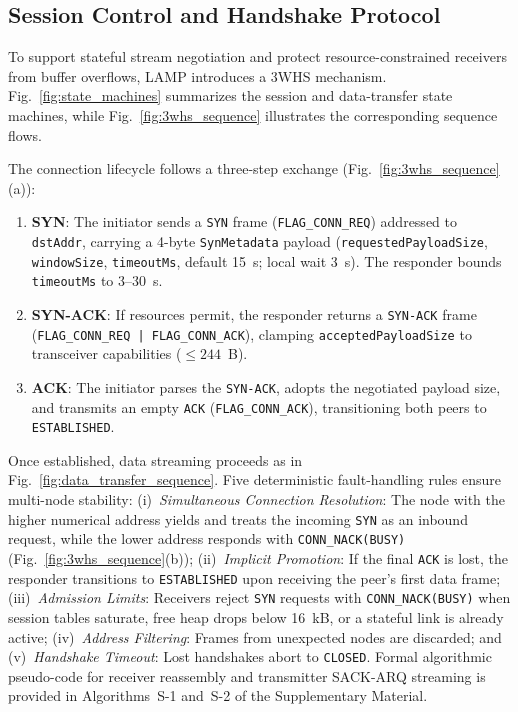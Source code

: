 \documentclass[journal]{IEEEtran}
\begin{document}
\subsection{Session Control and Handshake Protocol}
To support stateful stream negotiation and protect resource-constrained receivers from buffer overflows, \ac{LAMP} introduces a \ac{3WHS} mechanism. Fig.~\ref{fig:state_machines} summarizes the session and data-transfer state machines, while Fig.~\ref{fig:3whs_sequence} illustrates the corresponding sequence flows.

The connection lifecycle follows a three-step exchange (Fig.~\ref{fig:3whs_sequence}(a)):
\begin{enumerate}
  \item \textbf{SYN}: The initiator sends a \texttt{SYN} frame (\texttt{FLAG\_CONN\_REQ}) addressed to \texttt{dstAddr}, carrying a 4-byte \texttt{SynMetadata} payload (\texttt{requestedPayloadSize}, \texttt{windowSize}, \texttt{timeoutMs}, default 15~s; local wait 3~s). The responder bounds \texttt{timeoutMs} to 3--30~s.
  \item \textbf{SYN-ACK}: If resources permit, the responder returns a \texttt{SYN-ACK} frame (\texttt{FLAG\_CONN\_REQ | FLAG\_CONN\_ACK}), clamping \texttt{acceptedPayloadSize} to transceiver capabilities ($\le 244$~B).
  \item \textbf{ACK}: The initiator parses the \texttt{SYN-ACK}, adopts the negotiated payload size, and transmits an empty \texttt{ACK} (\texttt{FLAG\_CONN\_ACK}), transitioning both peers to \texttt{ESTABLISHED}.
\end{enumerate}
Once established, data streaming proceeds as in Fig.~\ref{fig:data_transfer_sequence}. Five deterministic fault-handling rules ensure multi-node stability: (i)~\textit{Simultaneous Connection Resolution}: The node with the higher numerical address yields and treats the incoming \texttt{SYN} as an inbound request, while the lower address responds with \texttt{CONN\_NACK(BUSY)} (Fig.~\ref{fig:3whs_sequence}(b)); (ii)~\textit{Implicit Promotion}: If the final \texttt{ACK} is lost, the responder transitions to \texttt{ESTABLISHED} upon receiving the peer's first data frame; (iii)~\textit{Admission Limits}: Receivers reject \texttt{SYN} requests with \texttt{CONN\_NACK(BUSY)} when session tables saturate, free heap drops below 16~kB, or a stateful link is already active; (iv)~\textit{Address Filtering}: Frames from unexpected nodes are discarded; and (v)~\textit{Handshake Timeout}: Lost handshakes abort to \texttt{CLOSED}. Formal algorithmic pseudo-code for receiver reassembly and transmitter SACK-ARQ streaming is provided in Algorithms~S-1 and~S-2 of the Supplementary Material.
\end{document}
